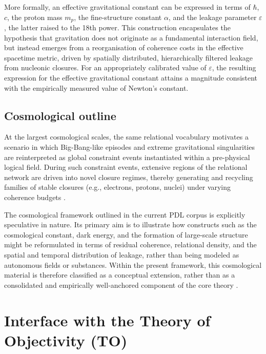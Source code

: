\documentclass{article}
\begin{document}
More formally, an effective gravitational constant can be expressed in terms of \(\hbar\), \(c\), the proton mass \(m_p\), the fine-structure constant \(\alpha\), and the leakage parameter \(\varepsilon\), the latter raised to the 18th power. This construction encapsulates the hypothesis that gravitation does not originate as a fundamental interaction field, but instead emerges from a reorganisation of coherence costs in the effective spacetime metric, driven by spatially distributed, hierarchically filtered leakage from nucleonic closures. For an appropriately calibrated value of \(\varepsilon\), the resulting expression for the effective gravitational constant attains a magnitude consistent with the empirically measured value of Newton’s constant.\citep{Exponent_18_PDL_2026,Coherence_Leakage_18_2026,PDL_position}

\subsection{Cosmological outline}
\label{subsec:cosmology_outline}

At the largest cosmological scales, the same relational vocabulary motivates a scenario in which Big-Bang-like episodes and extreme gravitational singularities are reinterpreted as global constraint events instantiated within a pre-physical logical field. During such constraint events, extensive regions of the relational network are driven into novel closure regimes, thereby generating and recycling families of stable closures (e.g., electrons, protons, nuclei) under varying coherence budgets \citep{PDL_Main_2026,PDL_position}.

The cosmological framework outlined in the current PDL corpus is explicitly speculative in nature. Its primary aim is to illustrate how constructs such as the cosmological constant, dark energy, and the formation of large-scale structure might be reformulated in terms of residual coherence, relational density, and the spatial and temporal distribution of leakage, rather than being modeled as autonomous fields or substances. Within the present framework, this cosmological material is therefore classified as a conceptual extension, rather than as a consolidated and empirically well-anchored component of the core theory \citep{PDL_Main_2026,PDL_position}.

\section{Interface with the Theory of Objectivity (TO)}
\label{sec:TO_interface}
\end{document}
